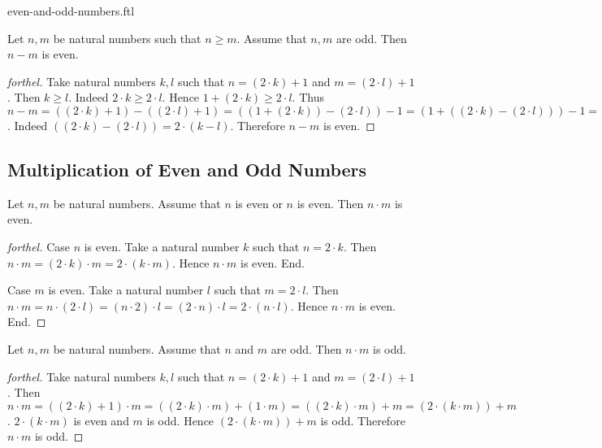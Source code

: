 \documentclass{naproche-library}
\begin{document}
\begin{smodule}{even-and-odd-numbers.ftl}
  \begin{proposition}[forthel,id=ARITHMETIC_15_0125478854587412]
    Let $n, m$ be natural numbers such that $n \geq m$.
    Assume that $n, m$ are odd.
    Then $n - m$ is even.
  \end{proposition}
  \begin{proof}[forthel]
    Take natural numbers $k, l$ such that $n = (2 \cdot k) + 1$ and $m = (2 \cdot l) + 1$.
    Then $k \geq l$.
    Indeed $2 \cdot k \geq 2 \cdot l$.
    Hence $1 + (2 \cdot k) \geq 2 \cdot l$.
    Thus $n - m
      = ((2 \cdot k) + 1) - ((2 \cdot l) + 1)
      = ((1 + (2 \cdot k)) - (2 \cdot l)) - 1
      = (1 + ((2 \cdot k) - (2 \cdot l))) - 1
      = (1 + (2 \cdot (k - l))) - 1
      = ((2 \cdot (k - l)) + 1) - 1
      = 2 \cdot (k - l)$.
    Indeed $((2 \cdot k) - (2 \cdot l)) = 2 \cdot (k - l)$. %
    Therefore $n - m$ is even.
  \end{proof}


  \subsection*{Multiplication of Even and Odd Numbers}

  \begin{proposition}[forthel,id=ARITHMETIC_15_0125698547589652]
    Let $n, m$ be natural numbers.
    Assume that $n$ is even or $n$ is even.
    Then $n \cdot m$ is even.
  \end{proposition}
  \begin{proof}[forthel]
    Case $n$ is even.
      Take a natural number $k$ such that $n = 2 \cdot k$.
      Then $n \cdot m
        = (2 \cdot k) \cdot m
        = 2 \cdot (k \cdot m)$.
      Hence $n \cdot m$ is even.
    End.

    Case $m$ is even.
      Take a natural number $l$ such that $m = 2 \cdot l$.
      Then $n \cdot m
        = n \cdot (2 \cdot l)
        = (n \cdot 2) \cdot l
        = (2 \cdot n) \cdot l
        = 2 \cdot (n \cdot l)$.
      Hence $n \cdot m$ is even.
    End.
  \end{proof}

  \begin{proposition}[forthel,id=ARITHMETIC_15_0236596587452145]
    Let $n, m$ be natural numbers.
    Assume that $n$ and $m$ are odd.
    Then $n \cdot m$ is odd.
  \end{proposition}
  \begin{proof}[forthel]
    Take natural numbers $k, l$ such that $n = (2 \cdot k) + 1$ and $m = (2 \cdot l) + 1$.
    Then $n \cdot m
      = ((2 \cdot k) + 1) \cdot m
      = ((2 \cdot k) \cdot m) + (1 \cdot m)
      = ((2 \cdot k) \cdot m) + m
      = (2 \cdot (k \cdot m)) + m$.
    $2 \cdot (k \cdot m)$ is even and $m$ is odd.
    Hence $(2 \cdot (k \cdot m)) + m$ is odd.
    Therefore $n \cdot m$ is odd.
  \end{proof}
\end{smodule}
\end{document}
